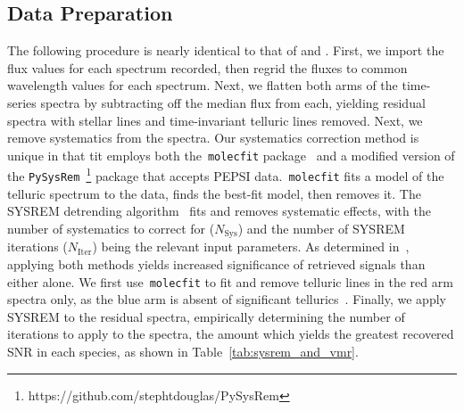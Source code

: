 \documentclass[twocolumn]{aastex631}
\newcommand{\code}[1]{\texttt{#1}}
\begin{document}
        \subsection{Data Preparation}\label{subsec:Data Preparation}
            The following procedure is nearly identical to that of \citet{Johnson2023} and \citet{Petz2023}. First, we import the flux values for each spectrum recorded, then regrid the fluxes to common wavelength values for each spectrum. Next, we flatten both arms of the time-series spectra by subtracting off the median flux from each, yielding residual spectra with stellar lines and time-invariant telluric lines removed. Next, we remove systematics from the spectra. Our systematics correction method is unique in that tit employs both the~\code{molecfit} package~\citep{Smette2015, Kausch2015} and a modified version of the \code{PySysRem}~\footnote{https://github.com/stephtdouglas/PySysRem} package that accepts PEPSI data.~\code{molecfit} fits a model of the telluric spectrum to the data, finds the best-fit model, then removes it. The SYSREM detrending algorithm~\citep{Tamuz2005} fits and removes systematic effects, with the number of systematics to correct for ($N_{\mathrm{Sys}}$) and the number of SYSREM iterations ($N_{\mathrm{Iter}}$) being the relevant input parameters. As determined in~\citet{Johnson2023}, applying both methods yields increased significance of retrieved signals than either alone. We first use~\code{molecfit} to fit and remove telluric lines in the red arm spectra only, as the blue arm is absent of significant tellurics~\citep{Smette2015}. Finally, we apply SYSREM to the residual spectra, empirically determining the number of iterations to apply to the spectra, the amount which yields the greatest recovered SNR in each species, as shown in Table~\ref{tab:sysrem_and_vmr}.
 
\end{document}
